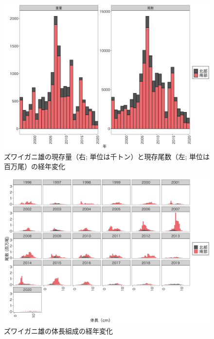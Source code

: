 \documentclass[11pt]{article} %
\begin{document}
\begin{linenumbers}
\begin{figure}[h]
  \centering
  \includegraphics[width = 14cm]{ズワイガニ雄trend.png}
  \caption{ズワイガニ雄の現存量（右; 単位は千トン）と現存尾数（左; 単位は百万尾）の経年変化}
\end{figure}

\begin{figure}[h]
  \centering
  \includegraphics[width = 14cm]{ズワイガニ雄length.png}
  \caption{ズワイガニ雄の体長組成の経年変化}
\end{figure}


\end{linenumbers}
\end{document}
